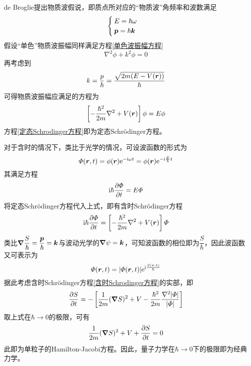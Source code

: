 de Broglie提出物质波假说，即质点所对应的“物质波”角频率和波数满足
\begin{equation}
\begin{cases}
	E = \hbar \omega \\
	\boldsymbol{p} = \hbar \boldsymbol{k}
\end{cases}
\end{equation}
假设“单色”物质波振幅同样满足方程\eqref{单色波振幅方程}
\begin{equation*}
	\nabla^2 \phi + k^2 \phi = 0
\end{equation*}
再考虑到
\begin{equation*}
	k = \frac{p}{\hbar} = \frac{\sqrt{2m(E-V(\boldsymbol{r}))}}{\hbar}
\end{equation*}
可得物质波振幅应满足的方程为
\begin{equation}
	\left[-\frac{\hbar^2}{2m} \nabla^2 + V(\boldsymbol{r})\right] \phi = E\phi
	\label{定态Schrodinger方程}
\end{equation}
方程\eqref{定态Schrodinger方程}即为{\heiti 定态Schr\"{o}dinger方程}。

对于含时的情况下，类比于光学的情况，可设波函数的形式为
\begin{equation*}
	\varPhi(\boldsymbol{r},t) = \phi(\boldsymbol{r}) \mathrm{e}^{-\mathrm{i} \omega t} = \phi(\boldsymbol{r}) \mathrm{e}^{-\mathrm{i} \frac{E}{\hbar} t}
\end{equation*}
其满足方程
\begin{equation}
	\mathrm{i}\hbar \frac{\partial \varPhi}{\partial t} = E\varPhi
\end{equation}
将定态Schr\"{o}dinger方程代入上式，即有{\heiti 含时Schr\"{o}dinger方程}
\begin{equation}
	\mathrm{i}\hbar \frac{\partial \varPhi}{\partial t} = \left[-\frac{\hbar^2}{2m} \nabla^2 + V(\boldsymbol{r})\right] \varPhi
	\label{含时Schrodinger方程}
\end{equation}
类比$\boldsymbol{\nabla} \dfrac{S}{\hbar} = \dfrac{\boldsymbol{p}}{\hbar} = \boldsymbol{k}$与波动光学的$\boldsymbol{\nabla} \psi = \boldsymbol{k}$，可知波函数的相位即为$\dfrac{S}{\hbar}$，因此波函数又可表示为
\begin{equation*}
	\varPhi(\boldsymbol{r},t) = |\varPhi(\boldsymbol{r},t)| \mathrm{e}^{\mathrm{i}\frac{S(\boldsymbol{r},t)}{\hbar}}
\end{equation*}
据此考虑含时Schr\"{o}dinger方程\eqref{含时Schrodinger方程}的实部，即
\begin{equation*}
	\frac{\partial S}{\partial t} = -\left[\frac{1}{2m} (\boldsymbol{\nabla} S)^2 + V - \frac{\hbar^2}{2m} \frac{\nabla^2 |\varPhi|}{|\varPhi|}\right]
\end{equation*}
取上式在$\hbar \to 0$的极限，可有
\begin{equation*}
	\frac{1}{2m} (\boldsymbol{\nabla} S)^2 + V + \frac{\partial S}{\partial t} = 0
\end{equation*}
此即为单粒子的Hamilton-Jacobi方程。因此，量子力学在$\hbar \to 0$下的极限即为经典力学。

